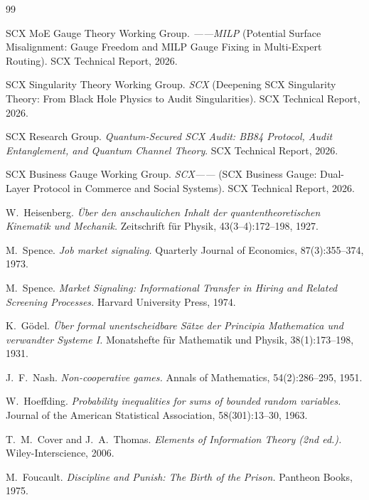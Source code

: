 \documentclass[12pt,a4paper]{article}
\theoremstyle{remark}
\begin{document}
\begin{thebibliography}{99}

SCX MoE Gauge Theory Working Group.
\textit{——MILP} (Potential Surface Misalignment: Gauge Freedom and MILP Gauge Fixing in Multi-Expert Routing).
SCX Technical Report, 2026.

SCX Singularity Theory Working Group.
\textit{SCX} (Deepening SCX Singularity Theory: From Black Hole Physics to Audit Singularities).
SCX Technical Report, 2026.

SCX Research Group.
\textit{Quantum-Secured SCX Audit: BB84 Protocol, Audit Entanglement, and Quantum Channel Theory}.
SCX Technical Report, 2026.

SCX Business Gauge Working Group.
\textit{SCX——} (SCX Business Gauge: Dual-Layer Protocol in Commerce and Social Systems).
SCX Technical Report, 2026.

W.~Heisenberg.
\textit{Über den anschaulichen Inhalt der quantentheoretischen Kinematik und Mechanik.}
Zeitschrift für Physik, 43(3--4):172--198, 1927.

M.~Spence.
\textit{Job market signaling.}
Quarterly Journal of Economics, 87(3):355--374, 1973.

M.~Spence.
\textit{Market Signaling: Informational Transfer in Hiring and Related Screening Processes.}
Harvard University Press, 1974.

K.~G\"{o}del.
\textit{Über formal unentscheidbare Sätze der Principia Mathematica und verwandter Systeme I.}
Monatshefte für Mathematik und Physik, 38(1):173--198, 1931.

J.~F.~Nash.
\textit{Non-cooperative games.}
Annals of Mathematics, 54(2):286--295, 1951.

W.~Hoeffding.
\textit{Probability inequalities for sums of bounded random variables.}
Journal of the American Statistical Association, 58(301):13--30, 1963.

T.~M.~Cover and J.~A.~Thomas.
\textit{Elements of Information Theory (2nd ed.).}
Wiley-Interscience, 2006.

M.~Foucault.
\textit{Discipline and Punish: The Birth of the Prison.}
Pantheon Books, 1975.


\end{thebibliography}
\end{document}
